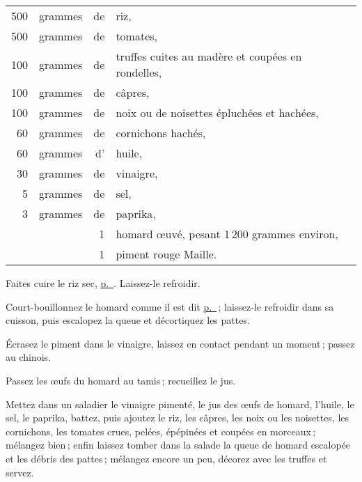 \footnotesize
\begin{longtable}{rrrp{16em}}
    500 & grammes & de & riz,                                                                             \\
    500 & grammes & de & tomates,                                                                         \\
    100 & grammes & de & truffes cuites au madère et coupées en rondelles,                                \\
    100 & grammes & de & câpres,                                                                          \\
    100 & grammes & de & noix ou de noisettes épluchées et hachées,                                       \\
     60 & grammes & de & cornichons hachés,                                                               \\
     60 & grammes & d' & huile,                                                                           \\
     30 & grammes & de & vinaigre,                                                                        \\
      5 & grammes & de & sel,                                                                             \\
      3 & grammes & de & paprika,                                                                         \\
        &         &  1 & homard œuvé, pesant 1 200 grammes environ,                                       \\
        &         &  1 & piment rouge Maille.                                                             \\
\end{longtable}
\normalsize

Faites cuire le riz sec, \hyperlink{p0707}{p. \pageref{pg0707}}. Laissez-le
refroidir.

Court-bouillonnez le homard comme il est dit
\hyperlink{p0284}{p. \pageref{pg0284}} ; laissez-le refroidir dans sa cuisson,
puis escalopez la queue et décortiquez les pattes.

Écrasez le piment dans le vinaigre, laissez en contact pendant un moment ;
passez au chinois.

Passez les œufs du homard au tamis ; recueillez le jus.

Mettez dans un saladier le vinaigre pimenté, le jus des œufs de homard,
l'huile, le sel, le paprika, battez, puis ajoutez le riz, les câpres, les noix
ou les noisettes, les cornichons, les tomates crues, pelées, épépinées et
coupées en morceaux ; mélangez bien ; enfin laissez tomber dans la salade la
queue de homard escalopée et les débris des pattes ; mélangez encore un peu,
décorez avec les truffes et servez.

